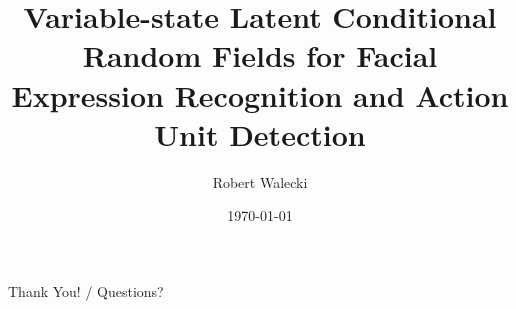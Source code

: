 \documentclass[t]{beamer}
\author{Robert Walecki}
\date{\today}
\title[VSL-CRF for Emotion Recognition and Action Unit Detection]{Variable-state Latent Conditional Random Fields for Facial Expression Recognition and Action Unit Detection}
\begin{document}

    \begin{frame}
        \titlepage
    \end{frame}



    



    
    \centering
    \Huge Thank You! / Questions?
    \newpage
    \tiny
    
    \vfill
\end{document}
